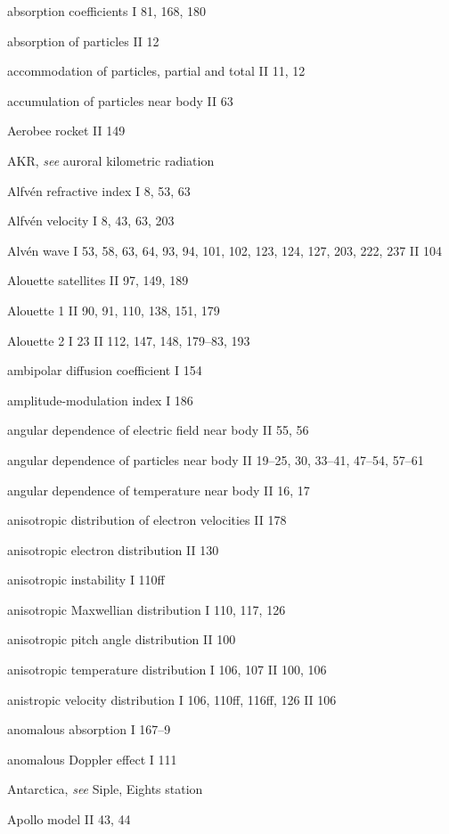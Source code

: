 \begin{thesubjectindex}
\item absorption coefficients I 81, 168, 180
\item absorption of particles II 12
\item accommodation of particles, partial and total II 11, 12
\item accumulation of particles near body II 63
\item Aerobee rocket II 149
\item AKR, {\it see\/} auroral kilometric radiation
\item Alfv\'en refractive index I 8, 53, 63
\item Alfv\'en velocity I 8, 43, 63, 203
\item Alv\'en wave I 53, 58, 63, 64, 93, 94, 101, 102, 123, 124, 127,
      203, 222, 237 II 104
\item Alouette satellites II 97, 149, 189
\item Alouette 1 II 90, 91, 110, 138, 151, 179
\item Alouette 2 I 23 II 112, 147, 148, 179--83, 193
\item ambipolar diffusion coefficient I 154
\item amplitude-modulation index I 186
\item angular dependence of electric field near body II 55, 56
\item angular dependence of particles near body II 19--25, 30, 33--41,
      47--54, 57--61
\item angular dependence of temperature near body II 16, 17
\item anisotropic distribution of electron velocities II 178
\item anisotropic electron distribution II 130
\item anisotropic instability I 110ff
\item anisotropic Maxwellian distribution I 110, 117, 126
\item anisotropic pitch angle distribution II 100
\item anisotropic temperature distribution I 106, 107 II 100, 106
\item anistropic velocity distribution I 106, 110ff, 116ff, 126 II 106
\item anomalous absorption I 167--9
\item anomalous Doppler effect I 111
\item Antarctica, {\it see\/} Siple, Eights station
\item Apollo model II 43, 44

\end{thesubjectindex}
